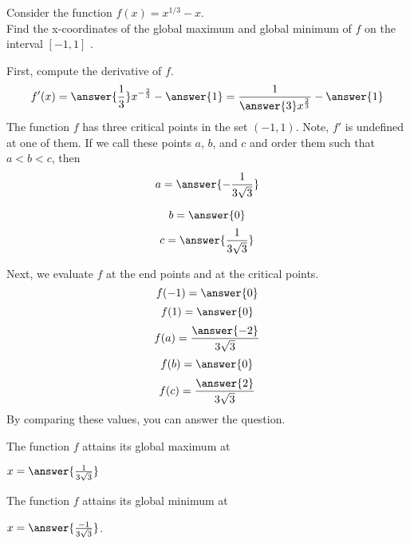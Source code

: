 \documentclass{ximera}
\author{ Nela Lakos}
\begin{document}
\begin{exercise}

Consider the function $f(x) =x^{1/3}-x$. \\
Find the x-coordinates of the global maximum and global minimum of $f$ on the interval $ [-1,1]$ .
\begin{hint}
First, compute the derivative of $f$.
$$
f'(x) = \answer{\frac{1}{3}}x^{-\frac{2}{3}}-\answer{1}=\frac{1}{\answer{3}x^{\frac{2}{3}}}-\answer{1}
$$
The function $f$ has three critical points in the set $(-1,1)$. Note, $f'$ is undefined at one of them.
 If we call these points $a$, $b$, and $c$ and order them such
that $a < b<c $, then
$$
a = \answer{-\frac{1}{3\sqrt{3}}}
$$

$$
b=\answer{0}
$$
$$
c=\answer{\frac{1}{3\sqrt{3}}}
$$
\end {hint}

\begin{hint}

Next, we evaluate $f$ at the end points and at the critical points.
$$
f(-1) = \answer{0}
$$
$$
f(1)=\answer{0}
$$
$$
f(a)=\frac{\answer{-2}}{3\sqrt{3}}
$$
$$
f(b)=\answer{0}
$$
$$
f(c)=\frac{\answer{2}}{3\sqrt{3}}
$$
By comparing these values, you can answer the question.
\end {hint}

The function $f$ attains its global maximum at	
\begin{prompt}
$x=\answer{\frac{1}{3\sqrt{3}}}$
\end{prompt}
The function $f$ attains its global minimum at	
\begin{prompt}
$x=\answer{\frac{-1}{3\sqrt{3}}}$.
\end{prompt}
\end{exercise}
\end{document}
